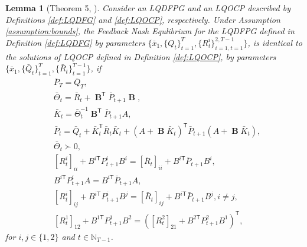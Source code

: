 \documentclass[letterpaper, 10 pt, conference]{ieeeconf}  %
\newcommand{\transpose}{\mathsf{T}}
\DeclareMathOperator{\contB}{\mathbf{B}}
\newtheorem{lemma}{Lemma}
\begin{document}
\begin{lemma}[Theorem 5, \cite{prasad_structure_2023}]\label{lemma:gamePGrelation}
    Consider an LQDFPG and an LQOCP described by Definitions \ref{def:LQDFG} and \ref{def:LQOCP}, respectively. Under Assumption \ref{assumption:bounds}, the Feedback Nash Equlibrium for the LQDFPG defined in Definition \ref{def:LQDFG} by parameters $\{\bar{x}_{1},\{Q_{t}\}_{t=1}^{T},\{R_{t}^{i}\}_{i=1,t=1}^{2,T-1}\}$, is identical to the solutions of LQOCP defined in Definition \ref{def:LQOCP}, by parameters $\{\bar{x}_{1},\{\bar{Q}_{t}\}_{t=1}^{T},\{\bar{R}_{t}\}_{t=1}^{T-1}\}$, if
    \begin{align*}
        &\bar{P}_{T} = \bar{Q}_{T},\\
        &\bar{\Theta}_{t} = \bar{R}_{t} + \contB^{\transpose}\bar{P}_{t+1}\contB,\\
        &\bar{K}_{t} = \bar{\Theta}_{t}^{-1}\contB^{\transpose}\bar{P}_{t+1}A,\\
        &\bar{P}_{t} = \bar{Q}_{t} + \bar{K}_{t}^{\transpose}\bar{R}_{t}\bar{K}_{t} + (A+\contB\bar{K}_{t})^{\transpose}\bar{P}_{t+1}(A+\contB\bar{K}_{t}),\\
        &\bar{\Theta}_{t} \succ 0,\\
        &[R_{t}^{i}]_{ii} + B^{i\transpose}P_{t+1}^{i}B^{i} = [\bar{R}_{t}]_{ii} + B^{i\transpose}\bar{P}_{t+1}B^{i},\\
        &B^{i\transpose}P_{t+1}^{i}A = B^{i\transpose}\bar{P}_{t+1}A,\\
        &[R_{t}^{i}]_{ij} + B^{i\transpose}P_{t+1}^{i}B^{j} = [\bar{R}_{t}]_{ij} + B^{i\transpose}\bar{P}_{t+1}B^{j},i\neq j,\\
        &[R_{t}^{1}]_{12} + B^{1\transpose}P_{t+1}^{1}B^{2} = ([R^{2}_{t}]_{21} + B^{2\transpose}P^{2}_{t+1}B^{1})^{\transpose},
    \end{align*}
    for $i,j\in \{1,2\}$ and $t \in \mathbb{N}_{T-1}$. 
\end{lemma}
\end{document}
